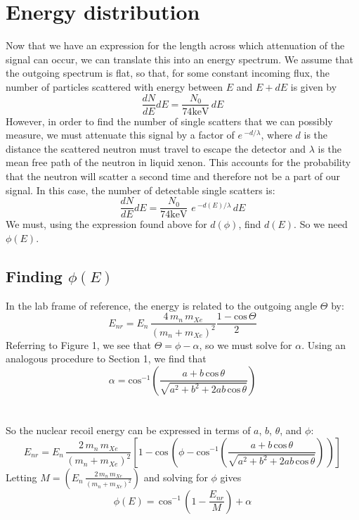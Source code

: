 \documentclass{article}
\begin{document}
\section{Energy distribution}
Now that we have an expression for the length across which attenuation of the signal can occur, we can translate this into an energy spectrum. We assume that the outgoing spectrum is flat, so that, for some constant incoming flux, the number of particles scattered with energy between $E$ and $E + dE$ is given by
\[ \frac{dN}{dE} dE = \frac{N_0}{74 \text{keV}} \, dE   \]
However, in order to find the number of single scatters that we can possibly measure, we must attenuate this signal by a factor of $e\,^{ -d / \lambda}$, where $d$ is the distance the scattered neutron must travel to escape the detector and $\lambda$ is the mean free path of the neutron in liquid xenon. This accounts for the probability that the neutron will scatter a second time and therefore not be a part of our signal. In this case, the number of detectable single scatters is:
\[ \frac{dN}{dE} dE = \frac{N_0}{74 \text{keV}} \, \, e \,^{ -d(E) / \lambda } \, dE \]
We must, using the expression found above for $d(\phi)$, find $d(E)$.  So we need $\phi(E)$.

\subsection{Finding $\phi(E)$}
In the lab frame of reference, the energy is related to the outgoing angle $\Theta$  by:
\[ E_{nr} = E_n \, \frac{4 \, m_n \, m_{Xe}}{(m_n + m_{Xe})^2} \frac{1 - \text{cos} \, \Theta}{2} \]
Referring to Figure 1, we see that $\Theta = \phi - \alpha$, so we must solve for $\alpha$.  Using an analogous procedure to Section 1, we find that 
\[ \alpha = \text{cos}^{-1} \left( \frac{a + b \, \text{cos} \, \theta}{\sqrt{a^2 + b^2 + 2 a b \, \text{cos} \, \theta}} \right) \]
\, \\ \, \\
So the nuclear recoil energy can be expressed in terms of $a$, $b$, $\theta$, and $\phi$:
\[ E_{nr} = E_n \, \frac{2 \, m_n \, m_{Xe}}{(m_n + m_{Xe})^2} \left[1 - \text{cos} \, \left( \phi - \text{cos}^{-1} \left( \frac{a + b \, \text{cos} \, \theta}{\sqrt{a^2 + b^2 + 2 a b \, \text{cos} \, \theta}} \right) \, \right)  \right] \]
Letting $ \displaystyle M = \left( E_n \, \frac{2 \, m_n \, m_{Xe}}{(m_n + m_{Xe})^2} \right) $ and solving for $\phi$ gives
\[ \phi (E) = \, \text{cos}^{-1} \, \left( 1 - \frac{E_{nr}}{M} \right) + \alpha \]
  
\end{document}
